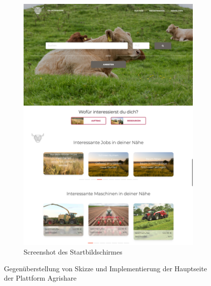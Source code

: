 \begin{figure}
\begin{subfigure}[b]{0.45\textwidth}
        \includegraphics[width=\textwidth]{99_IMG/03_Umsetzung/homeScreenshot.png}
        \caption{Screenshot des Startbildschirmes}
        \label{fig:mapScreenshot}
    \end{subfigure}
    \caption{Gegenüberstellung von Skizze und Implementierung der Hauptseite der Plattform Agrishare}\label{fig:homeView}
\end{figure}

